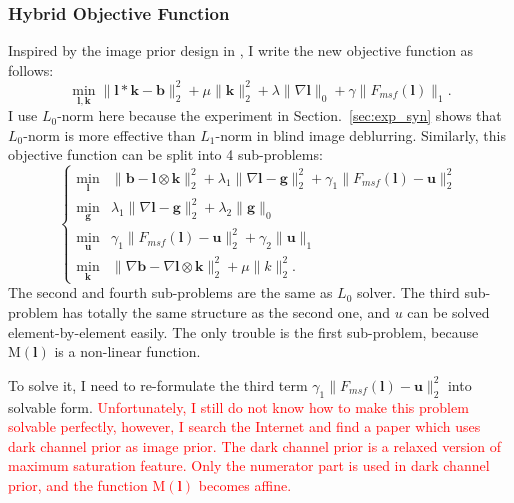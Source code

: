 \documentclass[journal, onecolumn, 10pt]{IEEEtran}
\begin{document}
\subsubsection{Hybrid Objective Function}
Inspired by the image prior design in \cite{pan2014deblurring}, I write the new objective function as follows:
\begin{equation}
\min_{\mathbf{l}, \mathbf{k}} \|\mathbf{l} * \mathbf{k} - \mathbf{b}\|_2^2 + \mu\|\mathbf{k}\|_2^2 +
\lambda\|\nabla \mathbf{l}\|_0 + \gamma \|F_{msf}(\mathbf{l})\|_1.
\label{eqn:ms_objective_function}
\end{equation}
I use $L_0$-norm here because the experiment in Section.~\ref{sec:exp_syn} shows that $L_0$-norm is more effective than $L_1$-norm in blind image deblurring. Similarly, this objective function can be split into 4 sub-problems:
\begin{equation}
\begin{cases}
\min_{\mathbf{l}} &\| \mathbf{b} - \mathbf{l} \otimes \mathbf{k} \|_2^2 + \lambda_1 \|\nabla \mathbf{l} - \mathbf{g}\|_2^2 + \gamma_1\|F_{msf}(\mathbf{l}) - \mathbf{u}\|_2^2 \\
\min_{\mathbf{g}} &\lambda_1\|\nabla \mathbf{l} - \mathbf{g}\|_2^2 + \lambda_2\|\mathbf{g}\|_{0} \\
\min_{\mathbf{u}} &\gamma_1\|F_{msf}(\mathbf{l}) - \mathbf{u}\|_2^2 + \gamma_2\|\mathbf{u}\|_{1} \\
\min_{\mathbf{k}} &\| \nabla\mathbf{b} - \nabla\mathbf{l} \otimes \mathbf{k} \|_2^2 + \mu \|k\|_2^2.
\end{cases}
\label{eqn:ms_objective_function_alter}
\end{equation}
The second and fourth sub-problems are the same as $L_0$ solver. The third sub-problem has totally the same structure as the second one, and $u$ can be solved element-by-element easily. 
The only trouble is the first sub-problem, because $\text{M}(\mathbf{l})$ is a non-linear function. 

To solve it, I need to re-formulate the third term $\gamma_1 \|F_{msf}(\mathbf{l}) - \mathbf{u}\|_2^2$ into solvable form. \textcolor{red}{Unfortunately, I still do not know how to make this problem solvable perfectly, however, I search the Internet and find a paper\cite{pan2016blind} which uses dark channel prior as image prior. The dark channel prior is a relaxed version of maximum saturation feature. Only the numerator part is used in dark channel prior, and the function $\text{M}(\mathbf{l})$ becomes affine.}
\end{document}
